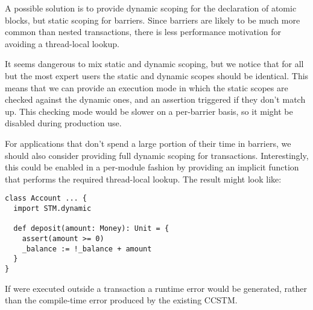 A possible solution is to provide dynamic scoping for the declaration
of atomic blocks, but static scoping for barriers.  Since barriers are
likely to be much more common than nested transactions, there is less
performance motivation for avoiding a thread-local lookup.

It seems dangerous to mix static and dynamic scoping, but we notice that
for all but the most expert users the static and dynamic scopes should be
identical.  This means that we can provide an execution mode in which the
static scopes are checked against the dynamic ones, and an assertion triggered
if they don't match up.  This checking mode would be slower on a per-barrier
basis, so it might be disabled during production use.

For applications that don't spend a large portion of their time in barriers, we
should also consider providing full dynamic scoping for transactions.
Interestingly, this could be enabled in a per-module fashion by providing an
implicit function that performs the required thread-local lookup.  The result
might look like:
\lstset{numbers=none}
\begin{lstlisting}
class Account ... {
  import STM.dynamic

  def deposit(amount: Money): Unit = {
    assert(amount >= 0)
    _balance := !_balance + amount
  }
}
\end{lstlisting}
\lstset{numbers=left}
If  were executed outside a transaction a runtime error would be
generated, rather than the compile-time error produced by the existing CCSTM.

